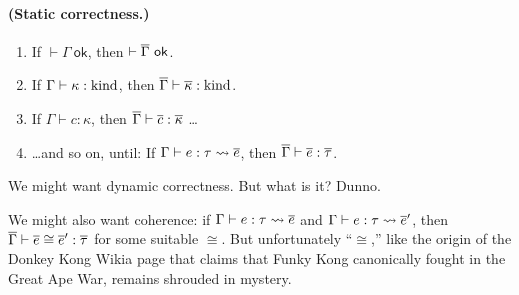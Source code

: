 \paragraph{(Static correctness.)}
\begin{enumerate}[1.]
  \item If $\vdash \Gamma~\mathsf{ok}$, then $\vdash \overline{\Gamma}~\mathsf{ok}$.
  \item If $\Gamma \vdash \kappa : \textnormal{kind}$, then $\overline{\Gamma} \vdash \overline{\kappa} : \textnormal{kind}$.
  \item If $\Gamma \vdash c : \kappa$, then $\overline{\Gamma} \vdash \overline{c} : \overline{\kappa}$ \ldots
  \item \ldots and so on, until:
    If $\Gamma \vdash e : \tau \leadsto \overline{e}$, then $\overline{\Gamma} \vdash \overline{e} : \overline{\tau}$.
\end{enumerate}

We might want dynamic correctness. But what is it? Dunno.

We might also want coherence: if $\Gamma \vdash e : \tau \leadsto \overline{e}$ and
$\Gamma \vdash e : \tau \leadsto \overline{e}'$, then $\overline{\Gamma} \vdash \overline{e} \cong \overline{e}' : \overline{\tau}$
for some suitable $\cong$.
But unfortunately ``$\cong$,'' like the origin of the Donkey Kong Wikia page that claims
that Funky Kong canonically fought in the Great Ape War,
remains shrouded in mystery.
